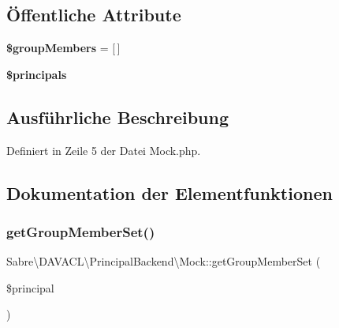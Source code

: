 \subsection*{Öffentliche Attribute}
\begin{DoxyCompactItemize}
\item 
\mbox{\label{class_sabre_1_1_d_a_v_a_c_l_1_1_principal_backend_1_1_mock_a4af4cc7a6c1cfa1abb176b16f954c31a}} 
{\bfseries \$group\+Members} = \mbox{[}$\,$\mbox{]}
\item 
\mbox{\label{class_sabre_1_1_d_a_v_a_c_l_1_1_principal_backend_1_1_mock_a3792dcd209dae71fbaa7b760cbbbdc49}} 
{\bfseries \$principals}
\end{DoxyCompactItemize}


\subsection{Ausführliche Beschreibung}


Definiert in Zeile 5 der Datei Mock.\+php.



\subsection{Dokumentation der Elementfunktionen}
\mbox{\label{class_sabre_1_1_d_a_v_a_c_l_1_1_principal_backend_1_1_mock_aca5c8ecd08f460c7144ec921d35bea0b}} 
\subsubsection{\texorpdfstring{get\+Group\+Member\+Set()}{getGroupMemberSet()}}
{\footnotesize\ttfamily Sabre\textbackslash{}\+D\+A\+V\+A\+C\+L\textbackslash{}\+Principal\+Backend\textbackslash{}\+Mock\+::get\+Group\+Member\+Set (\begin{DoxyParamCaption}\item[{}]{\$principal }\end{DoxyParamCaption})}

